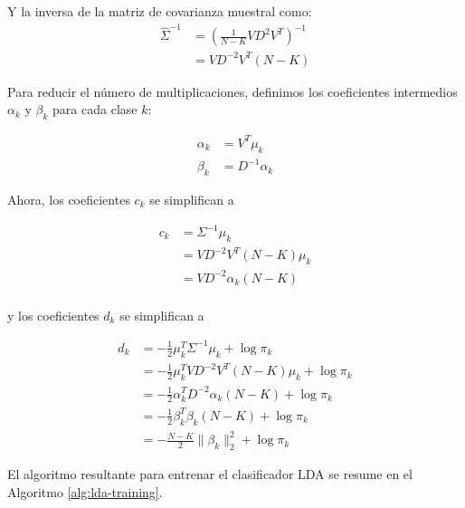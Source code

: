 Y la inversa de la matriz de covarianza muestral como:
\begin{align*}
\hat{\Sigma}^{-1} &= \left( \frac{1}{N-K} VD^{2}V^{T} \right)^{-1} \\
& = VD^{-2}V^{T} (N-K)
\end{align*}

Para reducir el número de multiplicaciones, definimos los coeficientes intermedios $\alpha_k$ y $\beta_k$ para cada clase $k$:

\begin{align*}
\alpha_{k} & = V^{T} \mu_{k}  \\
\beta_{k} &= D^{-1}\alpha_{k}
\end{align*}

Ahora, los coeficientes $c_{k}$ se simplifican a

\begin{align*}
c_{k} &= \Sigma^{-1} \mu_{k} \\
&= VD^{-2}V^{T} (N-K) \mu_{k} \\
&= VD^{-2} \alpha_{k} (N-K) \\
\end{align*}

y los coeficientes $d_{k}$ se simplifican a

\begin{align*}
d_{k} &= -\frac{1}{2} \mu_{k}^{T} \Sigma^{-1} \mu_{k} + \log \pi_{k} \\
&= -\frac{1}{2} \mu_{k}^{T} VD^{-2}V^{T} (N-K) \mu_{k} + \log \pi_{k} \\
&= -\frac{1}{2} \alpha_{k}^{T} D^{-2} \alpha_{k} (N-K) + \log \pi_{k}  \\
&= -\frac{1}{2} \beta_{k}^{T} \beta_{k} (N-K) + \log \pi_{k} \\
& = - \frac{N-K}{2} \| \beta_{k} \|^2_{2} + \log \pi_{k}
\end{align*}

El algoritmo resultante para entrenar el clasificador LDA se resume en el Algoritmo \ref{alg:lda-training}.

